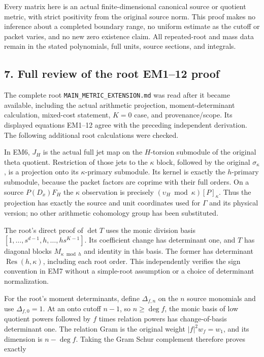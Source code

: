 Every matrix here is an actual finite-dimensional canonical source or
quotient metric, with strict positivity from the original source norm.
This proof makes no inference about a completed boundary range, no
uniform estimate as the cutoff or packet varies, and no new zero
existence claim. All repeated-root and mass data remain in the stated
polynomials, full units, source sections, and integrals.

\subsection*{7. Full review of the root EM1--12 proof}

The complete root \texttt{MAIN\_METRIC\_EXTENSION.md} was read after it became
available, including the actual arithmetic projection, moment-determinant
calculation, mixed-cost statement, \(K=0\) case, and provenance/scope. Its
displayed equations EM1--12 agree with the preceding independent
derivation. The following additional root calculations were checked.

In EM6, \(J_H\) is the actual full jet map on the \(H\)-torsion submodule of
the original theta quotient. Restriction of those jets to the \(\kappa\)
block, followed by the original \(\sigma_\kappa\), is a projection onto its
\(\kappa\)-primary submodule. Its kernel is exactly the \(h\)-primary submodule,
because the packet factors are coprime with their full orders. On a
source \(P(D_x)F_H\) the \(\kappa\) observation is precisely
\((\upsilon_H\bmod\kappa)[P]_\kappa\). Thus the projection has exactly the
source and unit coordinates used for \(\Gamma\) and its physical version;
no other arithmetic cohomology group has been substituted.

The root's direct proof of \(\det T\) uses the monic division basis
\([1,\ldots,s^{d-1},h,\ldots,hs^{K-1}]\). Its coefficient change has determinant
one, and \(T\) has diagonal blocks \(M_{\kappa\bmod h}\) and identity in this
basis. The former has determinant \(\operatorname{Res}(h,\kappa)\), including each root
order. This independently verifies the sign convention in EM7 without
a simple-root assumption or a choice of determinant normalization.

For the root's moment determinants, define \(\Delta_{f,n}\) on the \(n\) source
monomials and use \(\Delta_{f,0}=1\). At an onto cutoff \(n-1\), so \(n\ge\deg f\),
the monic basis of low quotient powers followed by \(f\) times relation
powers has change-of-basis determinant one. The relation Gram is the
original weight \(|f|^2w_f=w_1\), and its dimension is \(n-\deg f\).
Taking the Gram Schur complement therefore proves exactly

